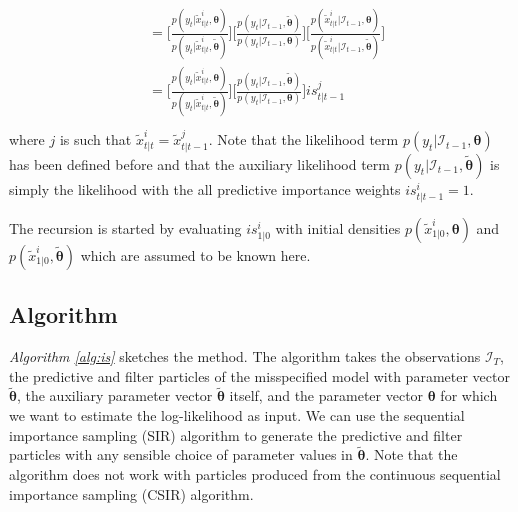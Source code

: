 \documentclass[11pt, oneside]{scrreprt}   	%
\begin{document}
\begin{enumerate}
\begin{align*}
\begin{split}
	&= \bigg[ \frac{p(y_t | \tilde{x}_{t|t}^i, \boldsymbol{\theta})}{p(y_t | \tilde{x}_{t|t}^i, \boldsymbol{\tilde{\theta}})} \bigg] \bigg[ \frac{p(y_t | \mathcal{I}_{t-1}, \boldsymbol{\tilde{\theta}})}{p(y_t | \mathcal{I}_{t-1}, \boldsymbol{\theta})} \bigg] \bigg[ \frac{p(\tilde{x}_{t|t}^i | \mathcal{I}_{t-1}, \boldsymbol{\theta})}{p(\tilde{x}_{t|t}^i | \mathcal{I}_{t-1}, \boldsymbol{\tilde{\theta}})} \bigg]\\	
	&= \bigg[ \frac{p(y_t | \tilde{x}_{t|t}^i, \boldsymbol{\theta})}{p(y_t | \tilde{x}_{t|t}^i, \boldsymbol{\tilde{\theta}})} \bigg] \bigg[ \frac{p(y_t | \mathcal{I}_{t-1}, \boldsymbol{\tilde{\theta}})}{p(y_t | \mathcal{I}_{t-1}, \boldsymbol{\theta})} \bigg] is_{t|t-1}^j\\		
	\end{split}					
	\end{align*}  
	where $j$ is such that $\tilde{x}_{t|t}^i = \tilde{x}_{t|t-1}^j$. Note that the likelihood term $p(y_t | \mathcal{I}_{t-1}, \boldsymbol{\theta})$ has been defined before and that the auxiliary likelihood term $p(y_t | \mathcal{I}_{t-1}, \boldsymbol{\tilde{\theta}})$ is simply the likelihood with the all predictive importance weights $is_{t|t-1}^i = 1$.
\end{enumerate}
The recursion is started by evaluating $is_{1|0}^i$ with initial densities $p(\tilde{x}_{1|0}^i, \boldsymbol{\theta})$ and $p(\tilde{x}_{1|0}^i, \boldsymbol{\tilde{\theta}})$ which are assumed to be known here. 

\subsection{Algorithm}
\textit{Algorithm \ref{alg:is}} sketches the method. The algorithm takes the observations $\mathcal{I}_T$, the predictive and filter particles of the misspecified model with parameter vector $\boldsymbol{\tilde{\theta}}$, the auxiliary parameter vector $\boldsymbol{\tilde{\theta}}$ itself, and the parameter vector $\boldsymbol{\theta}$ for which we want to estimate the log-likelihood as input. We can use the sequential importance sampling (SIR) algorithm to generate the predictive and filter particles with any sensible choice of parameter values in $\boldsymbol{\tilde{\theta}}$. Note that the algorithm does not work with particles produced from the continuous sequential importance sampling (CSIR) algorithm.\\
\end{document}

